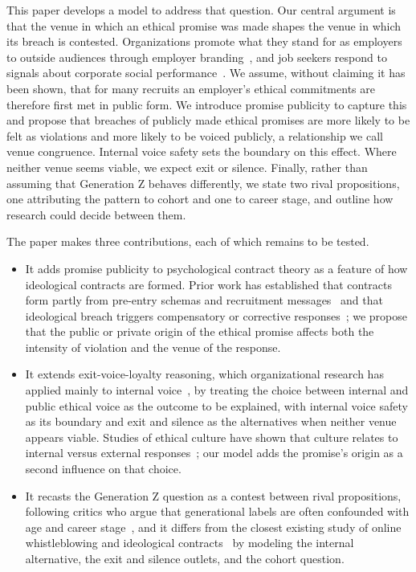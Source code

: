 \documentclass[12pt,a4paper]{article}
\theoremstyle{definition}
\begin{document}
This paper develops a model to address that question. Our central argument is that the venue in which an ethical promise was made shapes the venue in which its breach is contested. Organizations promote what they stand for as employers to outside audiences through employer branding~\citep{backhaus2004conceptualizing}, and job seekers respond to signals about corporate social performance~\citep{jones2014why}. We assume, without claiming it has been shown, that for many recruits an employer's ethical commitments are therefore first met in public form. We introduce promise publicity to capture this and propose that breaches of publicly made ethical promises are more likely to be felt as violations and more likely to be voiced publicly, a relationship we call venue congruence. Internal voice safety sets the boundary on this effect. Where neither venue seems viable, we expect exit or silence. Finally, rather than assuming that Generation Z behaves differently, we state two rival propositions, one attributing the pattern to cohort and one to career stage, and outline how research could decide between them.

The paper makes three contributions, each of which remains to be tested.

\begin{itemize}
\item It adds promise publicity to psychological contract theory as a feature of how ideological contracts are formed. Prior work has established that contracts form partly from pre-entry schemas and recruitment messages~\citep{rousseau2001schema} and that ideological breach triggers compensatory or corrective responses~\citep{yang2022going,deng2023serving}; we propose that the public or private origin of the ethical promise affects both the intensity of violation and the venue of the response.

\item It extends exit-voice-loyalty reasoning, which organizational research has applied mainly to internal voice~\citep{morrison2014employee}, by treating the choice between internal and public ethical voice as the outcome to be explained, with internal voice safety as its boundary and exit and silence as the alternatives when neither venue appears viable. Studies of ethical culture have shown that culture relates to internal versus external responses~\citep{kaptein2011inaction}; our model adds the promise's origin as a second influence on that choice.

\item It recasts the Generation Z question as a contest between rival propositions, following critics who argue that generational labels are often confounded with age and career stage~\citep{rudolph2017considering,parry2011generational}, and it differs from the closest existing study of online whistleblowing and ideological contracts~\citep{yang2026managing} by modeling the internal alternative, the exit and silence outlets, and the cohort question.
\end{itemize}
\end{document}
